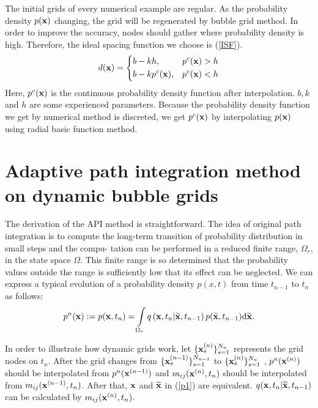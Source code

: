 \documentclass[a4paper, 11pt, final]{article}
\begin{document}
The initial grids of every numerical example are regular.
As the probability density $p({\bf x})$ changing, the grid
will be regenerated by bubble grid method. In order to
improve the accuracy, nodes should gather where probability
density is high. Therefore, the ideal spacing function
we choose is (\ref{ISF}).
\begin{equation}
    \label{ISF}
    d({\bf x}) = \left\{ \begin{aligned}
        & b - kh,            & p^c({\bf x}) > h \\
        & b - kp^c({\bf x}), & p^c({\bf x}) < h \\
    \end{aligned} \right.
\end{equation}
Here, $p^c({\bf x})$ is the continuous probability density
function after interpolation. $b,k$ and $h$ are some
experienced parameters. Because the probability density
function we get by numerical method is discreted, we
get $p^c({\bf x})$ by interpolating $p({\bf x})$
using radial basic function method.


\section{Adaptive path integration method on dynamic bubble grids}
The derivation of the API method is straightforward. The idea of original path integration
is to compute the long-term transition of probability distribution in small steps and the compu-
tation can be performed in a reduced finite range, $\Omega_r$, in the state space $\Omega$.
This finite range is so determined that the probability values outside the range is sufficiently
low that its effect can be neglected. We can express a typical evolution of a probability
density $p(x, t)$ from time $t_{n-1}$ to $t_n$ as follows:
\begin{equation}\label{p1}
    p^{n}({\bf x}):=p({\bf x},t_n)=\int\limits_{\Omega_r}q\left({\bf
    x},t_n|{\bf \widetilde{x}},t_{n-1}\right)p({\bf
    \widetilde{x}},t_{n-1}){\rm d}{\bf \widetilde{x}}.
\end{equation}

In order to illustrate how dynamic grids work, let $\{{\bf x}_s^{(n)}\}_{s=1}^{N_n}$ represents the grid nodes on $t_n$.
After the grid changes from $\{{\bf x}_s^{(n-1)}\}_{s=1}^{N_{n-1}}$  to $\{{\bf x}_s^{(n)}\}_{s=1}^{N_n}$ ,
$p^{n}({{\bf x}^{(n)}})$ should be interpolated from $p^{n}({{\bf x}^{(n-1)}})$ and $m_{ij}({{\bf x}^{(n)},t_n})$
should be interpolated from $m_{ij}({{\bf x}^{(n-1)},t_n})$. After that, ${\bf x}$ and ${\bf \widetilde{x}}$ in (\ref{p1})
are equivalent.
$q({\bf x},t_n|{\bf \widetilde{x}},t_{n-1})$ can be calculated by  $m_{ij}({{\bf x}^{(n)},t_n})$.
\end{document}
